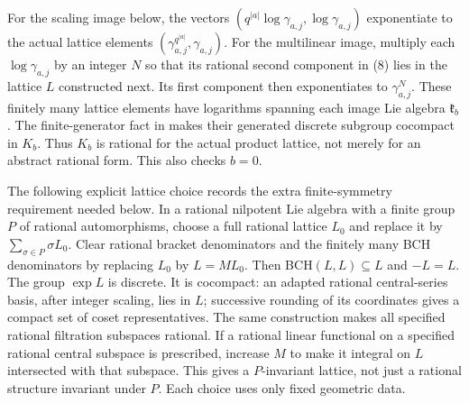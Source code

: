 \documentclass[11pt]{article}
\begin{document}
For the scaling image below, the vectors
$(q^{|a|}\log\gamma_{a,j},\log\gamma_{a,j})$ exponentiate to the actual
lattice elements $(\gamma_{a,j}^{q^{|a|}},\gamma_{a,j})$. For the
multilinear image, multiply each $\log\gamma_{a,j}$ by an integer $N$
so that its rational second component in (8) lies in the lattice $L$
constructed next. Its first component then exponentiates to
$\gamma_{a,j}^N$. These finitely many lattice elements have logarithms
spanning each image Lie algebra $\mathfrak k_b$. The finite-generator
fact in \cite[p.~1243]{GTZ} makes their generated discrete subgroup
cocompact in $K_b$. Thus $K_b$ is rational for the actual product lattice,
not merely for an abstract rational form. This also checks $b=0$.

The following explicit lattice choice records
the extra finite-symmetry requirement needed below. In a rational
nilpotent Lie algebra with a finite group $P$ of rational automorphisms,
choose a full rational lattice $L_0$ and replace it by
$\sum_{\sigma\in P}\sigma L_0$. Clear rational bracket denominators and
the finitely many BCH denominators by replacing $L_0$ by $L=M L_0$.
Then BCH$(L,L)\subseteq L$ and $-L=L$. The group $\exp L$ is discrete.
It is cocompact: an adapted rational central-series basis, after integer
scaling, lies in $L$; successive rounding of its coordinates gives a
compact set of coset representatives. The same construction makes all
specified rational filtration subspaces rational. If a rational linear
functional on a specified rational central subspace is prescribed,
increase $M$ to make it integral on $L$ intersected with that subspace.
This gives a $P$-invariant lattice, not just a rational structure invariant
under $P$. Each choice uses only fixed geometric data.
\end{document}
